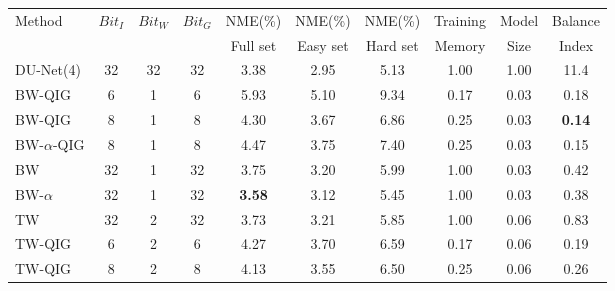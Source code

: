 \begin{table}[t!]
\begin{center}

\label{tb:IWG-QUAN}
\begin{tabular}{lccccccccc}
\toprule
\multirow{2}{*}{Method} & {$Bit_I$}  & $Bit_W$  & $Bit_G$ & NME(\%) & NME(\%) & NME(\%) & Training  &  Model & Balance\\
& & & & Full set & Easy set & Hard set & Memory & Size & Index\\

\hline
DU-Net(4)  &  32  & 32  & 32  & 3.38 & 2.95 & 5.13 & 1.00 & 1.00 & 11.4 \\
\hline
BW-QIG     &  6   & 1   & 6   & 5.93 & 5.10 & 9.34 & 0.17 & 0.03 & 0.18	\\
BW-QIG     &  8   & 1   & 8   & 4.30 & 3.67 & 6.86 & 0.25 & 0.03 & \bf{0.14}	    \\
BW-$\alpha$-QIG    &  8   & 1   & 8   & 4.47 & 3.75 & 7.40 & 0.25 & 0.03 & 0.15  \\
BW         &  32  & 1   & 32  & 3.75 & 3.20 & 5.99 & 1.00 & 0.03 & 0.42	\\
BW-$\alpha$        &  32  & 1   & 32  & {\bf 3.58} & 3.12 & 5.45 & 1.00 & 0.03 & 0.38  \\
TW         &  32  & 2   & 32  & 3.73 & 3.21 & 5.85 & 1.00 & 0.06 & 0.83  \\
TW-QIG     &  6   & 2   & 6   & 4.27 & 3.70 & 6.59 & 0.17 & 0.06 & 0.19	\\
TW-QIG     &  8   & 2   & 8   & 4.13 & 3.55 & 6.50 & 0.25 & 0.06 & 0.26   \\
\bottomrule
\end{tabular}

\end{center}
\end{table}

